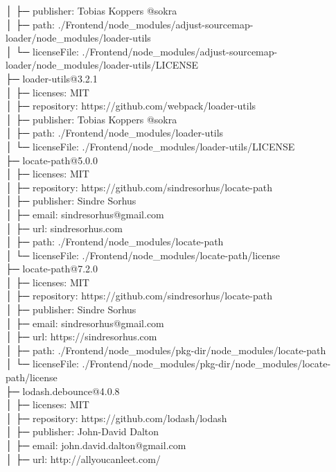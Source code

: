 │  ├─ publisher: Tobias Koppers @sokra\\
│  ├─ path: ./Frontend/node\_modules/adjust-sourcemap-loader/node\_modules/loader-utils\\
│  └─ licenseFile: ./Frontend/node\_modules/adjust-sourcemap-loader/node\_modules/loader-utils/LICENSE\\
├─ loader-utils@3.2.1\\
│  ├─ licenses: MIT\\
│  ├─ repository: https://github.com/webpack/loader-utils\\
│  ├─ publisher: Tobias Koppers @sokra\\
│  ├─ path: ./Frontend/node\_modules/loader-utils\\
│  └─ licenseFile: ./Frontend/node\_modules/loader-utils/LICENSE\\
├─ locate-path@5.0.0\\
│  ├─ licenses: MIT\\
│  ├─ repository: https://github.com/sindresorhus/locate-path\\
│  ├─ publisher: Sindre Sorhus\\
│  ├─ email: sindresorhus@gmail.com\\
│  ├─ url: sindresorhus.com\\
│  ├─ path: ./Frontend/node\_modules/locate-path\\
│  └─ licenseFile: ./Frontend/node\_modules/locate-path/license\\
├─ locate-path@7.2.0\\
│  ├─ licenses: MIT\\
│  ├─ repository: https://github.com/sindresorhus/locate-path\\
│  ├─ publisher: Sindre Sorhus\\
│  ├─ email: sindresorhus@gmail.com\\
│  ├─ url: https://sindresorhus.com\\
│  ├─ path: ./Frontend/node\_modules/pkg-dir/node\_modules/locate-path\\
│  └─ licenseFile: ./Frontend/node\_modules/pkg-dir/node\_modules/locate-path/license\\
├─ lodash.debounce@4.0.8\\
│  ├─ licenses: MIT\\
│  ├─ repository: https://github.com/lodash/lodash\\
│  ├─ publisher: John-David Dalton\\
│  ├─ email: john.david.dalton@gmail.com\\
│  ├─ url: http://allyoucanleet.com/\\
